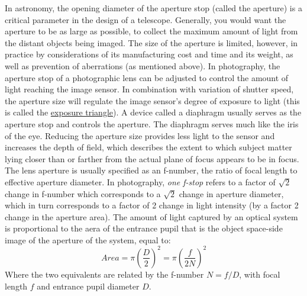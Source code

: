 \documentclass[10pt]{article}
\begin{document}
\begin{multicols}{2}
\begin{itemize}
\end{itemize}
In astronomy, the opening diameter of the aperture stop (called the aperture) is a critical parameter in the design of a telescope. Generally, you would want the aperture to be as large as possible, to collect the maximum amount of light from the distant objects being imaged. The size of the aperture is limited, however, in practice by considerations of its manufacturing cost and time and its weight, as well as prevention of aberrations (as mentioned above).
\newline \newline
In photography, the aperture stop of a photographic lens can be adjusted to control the amount of light reaching the image sensor. In combination with variation of shutter speed, the aperture size will regulate the image sensor's degree of exposure to light (this is called the \href{https://photographylife.com/what-is-exposure-triangle}{exposure triangle}). A device called a diaphragm usually serves as the aperture stop and controls the aperture. The diaphragm serves much like the iris of the eye. Reducing the aperture size provides less light to the sensor and increases the depth of field, which describes the extent to which subject matter lying closer than or farther from the actual plane of focus appears to be in focus.
The lens aperture is usually specified as an f-number, the ratio of focal length to effective aperture diameter. In photography, \textit{one f-stop} refers to a factor of $\sqrt{2}$ change in f-number which corresponds to a $\sqrt{2}$ change in aperture diameter, which in turn corresponds to a factor of 2 change in light intensity (by a factor 2 change in the aperture area).
The amount of light captured by an optical system is proportional to the aera of the entrance pupil that is the object space-side image of the aperture of the system, equal to:
\[
Area = \pi (\frac{D}{2})^2 = \pi (\frac{f}{2N})^2
\]
Where the two equivalents are related by the f-number $N=f/D$, with focal length $f$ and entrance pupil diameter $D$.


\end{multicols}
\end{document}
